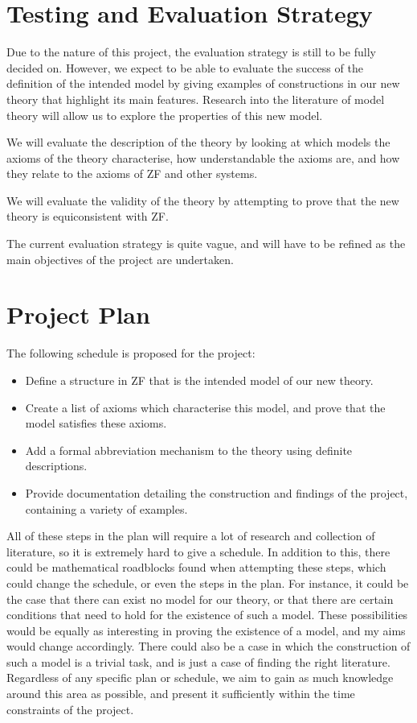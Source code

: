\documentclass[11pt]{article}
\theoremstyle{definition}
\theoremstyle{theorem}
\theoremstyle{lemma}
\begin{document}
\section{Testing and Evaluation Strategy}
Due to the nature of this project, the evaluation strategy is still to be fully decided on.
However, we expect to be able to evaluate the success of the definition of the intended model by giving examples of constructions in our new theory that highlight its main features. Research into the literature of model theory will allow us to explore the properties of this new model.

We will evaluate the description of the theory by looking at which models the axioms of the theory characterise, how understandable the axioms are, and how they relate to the axioms of ZF and other systems.

We will evaluate the validity of the theory by attempting to prove that the new theory is equiconsistent with ZF.

The current evaluation strategy is quite vague, and will have to be refined as the main objectives of the project are undertaken.
\section{Project Plan}
The following schedule is proposed for the project:
\begin{itemize}
\item Define a structure in ZF that is the intended model of our new theory.
\item Create a list of axioms which characterise this model, and prove that the model satisfies these axioms.
\item Add a formal abbreviation mechanism to the theory using definite descriptions.
\item Provide documentation detailing the construction and findings of the project, containing a variety of examples.
\end{itemize}
All of these steps in the plan will require a lot of research and collection of literature, so it is extremely hard to give a schedule.
In addition to this, there could be mathematical roadblocks found when attempting these steps, which could change the schedule, or even the steps in the plan.
For instance, it could be the case that there can exist no model for our theory, or that there are certain conditions that need to hold for the existence of such a model.
These possibilities would be equally as interesting in proving the existence of a model, and my aims would change accordingly.
There could also be a case in which the construction of such a model is a trivial task, and is just a case of finding the right literature.
Regardless of any specific plan or schedule, we aim to gain as much knowledge around this area  as possible, and present it sufficiently within the time constraints of the project.
\end{document}
